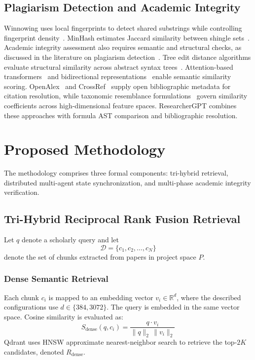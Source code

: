 \documentclass[conference]{IEEEtran}
\begin{document}
\subsection{Plagiarism Detection and Academic Integrity}
Winnowing uses local fingerprints to detect shared substrings while controlling fingerprint density~\cite{schleimer2003winnowing}. MinHash estimates Jaccard similarity between shingle sets~\cite{broder1997resemblance}. Academic integrity assessment also requires semantic and structural checks, as discussed in the literature on plagiarism detection~\cite{foltynek2019plagiarism}. Tree edit distance algorithms evaluate structural similarity across abstract syntax trees~\cite{zhang1989tree}. Attention-based transformers~\cite{vaswani2017attention} and bidirectional representations~\cite{devlin2019bert} enable semantic similarity scoring. OpenAlex~\cite{priem2022openalex} and CrossRef~\cite{hendricks2020crossref} supply open bibliographic metadata for citation resolution, while taxonomic resemblance formulations~\cite{sneath1973taxonomy} govern similarity coefficients across high-dimensional feature spaces. ResearcherGPT combines these approaches with formula AST comparison and bibliographic resolution.

\section{Proposed Methodology}
The methodology comprises three formal components: tri-hybrid retrieval, distributed multi-agent state synchronization, and multi-phase academic integrity verification.

\subsection{Tri-Hybrid Reciprocal Rank Fusion Retrieval}
Let $q$ denote a scholarly query and let
\begin{equation}
\mathcal{D} = \{c_1, c_2, \ldots, c_N\}
\label{eq:corpus}
\end{equation}
denote the set of chunks extracted from papers in project space $P$.

\subsubsection{Dense Semantic Retrieval}
Each chunk $c_i$ is mapped to an embedding vector $v_i \in \mathbb{R}^d$, where the described configurations use $d \in \{384, 3072\}$. The query is embedded in the same vector space. Cosine similarity is evaluated as:
\begin{equation}
S_{\mathrm{dense}}(q, c_i) = \frac{q \cdot v_i}{\|q\|_2 \, \|v_i\|_2}
\label{eq:cosine}
\end{equation}
Qdrant uses HNSW approximate nearest-neighbor search to retrieve the top-$2K$ candidates, denoted $R_{\mathrm{dense}}$.
\end{document}

